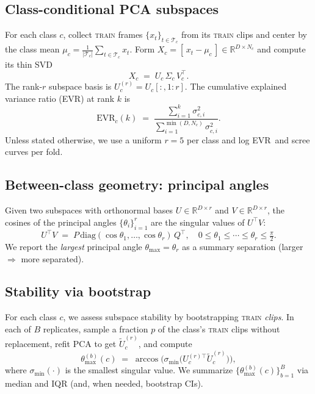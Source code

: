 \documentclass[11pt]{article}
\newcommand{\D}{\ensuremath{D}\xspace}
\newcommand{\rankr}{\ensuremath{r}\xspace}
\newcommand{\EVR}{EVR\xspace}
\begin{document}
\subsection*{Class-conditional PCA subspaces}
For each class $c$, collect \textsc{train} frames $\{x_t\}_{t\in\mathcal{T}_c}$ from its \textsc{train} clips and center by the class mean
$\mu_c=\frac{1}{|\mathcal{T}_c|}\sum_{t\in\mathcal{T}_c}x_t$. Form $X_c=[\,x_t-\mu_c\,] \in \mathbb{R}^{\D\times N_c}$ and compute its thin SVD
\begin{equation}
X_c \;=\; U_c\,\Sigma_c\,V_c^\top.
\end{equation}
The rank-$\rankr$ subspace basis is $U_c^{(\rankr)} = U_c[:,1\!:\!\rankr]$. The cumulative explained variance ratio (\EVR) at rank $k$ is
\begin{equation}
\mathrm{EVR}_c(k) \;=\; \frac{\sum_{i=1}^{k}\sigma_{c,i}^2}{\sum_{i=1}^{\min(\D,N_c)}\sigma_{c,i}^2}.
\end{equation}
Unless stated otherwise, we use a uniform $\rankr=5$ per class and log \EVR\ and scree curves per fold.

\subsection*{Between-class geometry: principal angles}
Given two subspaces with orthonormal bases $U\in\mathbb{R}^{\D\times r}$ and $V\in\mathbb{R}^{\D\times r}$, the cosines of the principal angles
$\{\theta_i\}_{i=1}^{r}$ are the singular values of $U^\top V$:
\begin{equation}
U^\top V \;=\; P\,\mathrm{diag}(\cos\theta_1,\dots,\cos\theta_r)\,Q^\top,\quad 0\le \theta_1\le\cdots\le \theta_r\le \tfrac{\pi}{2}.
\end{equation}
We report the \emph{largest} principal angle $\theta_{\max}=\theta_r$ as a summary separation (larger $\Rightarrow$ more separated).

\subsection*{Stability via bootstrap}
For each class $c$, we assess subspace stability by bootstrapping \textsc{train} \emph{clips}. In each of $B$ replicates, sample a fraction $p$ of the class’s \textsc{train} clips without replacement, refit PCA to get $\tilde U_c^{(\rankr)}$, and compute
\begin{equation}
\theta_{\max}^{(b)}(c) \;=\; \arccos\!\big(\sigma_{\min}\big(U_c^{(\rankr)\top}\tilde U_c^{(\rankr)}\big)\big),
\end{equation}
where $\sigma_{\min}(\cdot)$ is the smallest singular value. We summarize $\{\theta_{\max}^{(b)}(c)\}_{b=1}^{B}$ via median and IQR (and, when needed, bootstrap CIs).
\end{document}
